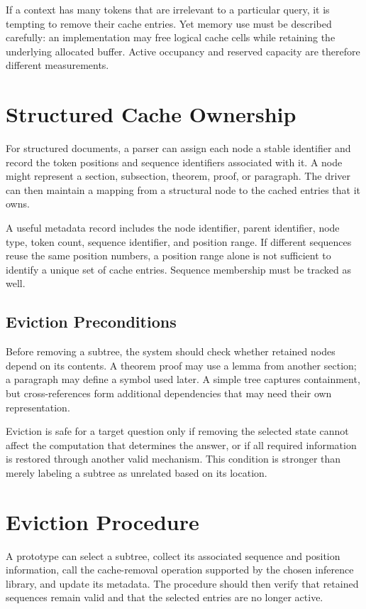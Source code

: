 \documentclass{article}
\begin{document}
If a context has many tokens that are irrelevant to a particular query, it is tempting to remove their cache entries. Yet memory use must be described carefully: an implementation may free logical cache cells while retaining the underlying allocated buffer. Active occupancy and reserved capacity are therefore different measurements.

\section{Structured Cache Ownership}
For structured documents, a parser can assign each node a stable identifier and record the token positions and sequence identifiers associated with it. A node might represent a section, subsection, theorem, proof, or paragraph. The driver can then maintain a mapping from a structural node to the cached entries that it owns.

A useful metadata record includes the node identifier, parent identifier, node type, token count, sequence identifier, and position range. If different sequences reuse the same position numbers, a position range alone is not sufficient to identify a unique set of cache entries. Sequence membership must be tracked as well.

\subsection{Eviction Preconditions}
Before removing a subtree, the system should check whether retained nodes depend on its contents. A theorem proof may use a lemma from another section; a paragraph may define a symbol used later. A simple tree captures containment, but cross-references form additional dependencies that may need their own representation.

Eviction is safe for a target question only if removing the selected state cannot affect the computation that determines the answer, or if all required information is restored through another valid mechanism. This condition is stronger than merely labeling a subtree as unrelated based on its location.

\section{Eviction Procedure}
A prototype can select a subtree, collect its associated sequence and position information, call the cache-removal operation supported by the chosen inference library, and update its metadata. The procedure should then verify that retained sequences remain valid and that the selected entries are no longer active.
\end{document}
